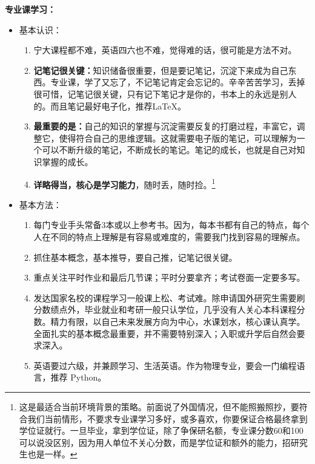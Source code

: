 {\bf 专业课学习：}
\begin{itemize}
\item 基本认识：
\begin{enumerate}
\item 宁大课程都不难，英语四六也不难，觉得难的话，很可能是方法不对。

\item {\bf 记笔记很关键：}知识储备很重要，但是要记笔记，沉淀下来成为自己东西。专业课，学了又忘了，不记笔记肯定会忘记的。辛辛苦苦学习，丢掉很可惜，记笔记很关键，只有记下笔记才是你的，书本上的永远是别人的。而且笔记最好电子化，推荐\LaTeX 。

\item {\bf 最重要的是：}自己的知识的掌握与沉淀需要反复的打磨过程，丰富它，调整它，使得符合自己的思维逻辑。这就需要电子版的笔记，可以理解为一个可以不断升级的笔记，不断成长的笔记。笔记的成长，也就是自己对知识掌握的成长。

\item {\bf 详略得当，核心是学习能力}，随时丢，随时捡。\footnote{这是最适合当前环境背景的策略。前面说了外国情况，但不能照搬照抄，要符合我们当前情形，不要求专业课学习多好，或多喜欢，你要保证合格最终拿到学位证就行。一旦毕业，拿到学位证，除了争保研名额，专业课分数60和100可以说没区别，因为用人单位不关心分数，而是学位证和额外的能力，招研究生也是一样。}
\end{enumerate}

\item 基本方法：
\begin{enumerate}
\item  每门专业手头常备3本或以上参考书。因为，每本书都有自己的特点，每个人在不同的特点上理解是有容易或难度的，需要我门找到容易的理解点。

\item 抓住基本概念，基本推导，要自己推，记笔记很关键。

\item 重点关注平时作业和最后几节课；平时分要拿齐；考试卷面一定要多写。

\item 发达国家名校的课程学习一般课上松、考试难。除申请国外研究生需要刷分数绩点外，毕业就业和考研一般只认学位，几乎没有人关心本科课程分数。精力有限，以自己未来发展方向为中心，水课划水，核心课认真学。全面扎实的基本概念最重要，并不需要特别深入；入职或升学后自然会要求深入。

\item 英语要过六级，并兼顾学习、生活英语。作为物理专业，要会一门编程语言，推荐 Python。
\end{enumerate}

\end{itemize}


